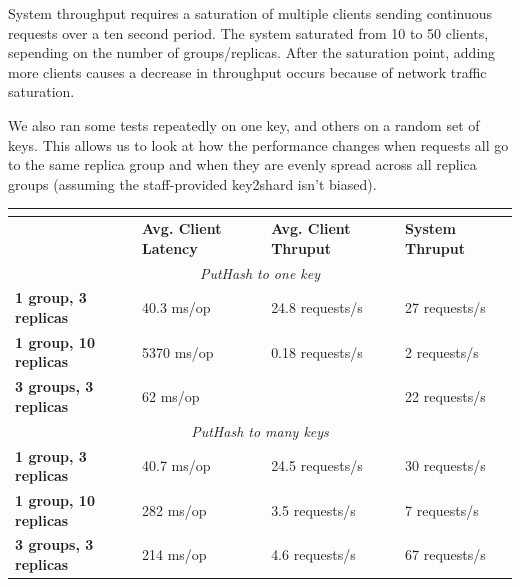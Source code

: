 \documentclass[letterpaper,10pt]{article}
\begin{document}
System throughput requires a saturation of multiple clients sending
continuous requests over a ten second period. The system saturated
from 10 to 50 clients, sepending on the number of
groups/replicas. After the saturation point, adding more clients
causes a decrease in throughput occurs because of network traffic
saturation.

We also ran some tests repeatedly on one key, and others on a random
set of keys. This allows us to look at how the performance changes
when requests all go to the same replica group and when they are
evenly spread across all replica groups (assuming the staff-provided
key2shard isn't biased).

\begin{table}[h]
\begin{tabular}{|l|l|l|l|}
\hline
\multicolumn{4}{|c|}{\cellcolor[HTML]{C0C0C0}{\color[HTML]{000000} \textbf{Vanilla Paxos}}}                           \\ \hline
                              & \textbf{Avg. Client Latency} & \textbf{Avg. Client Thruput} & \textbf{System Thruput} \\ \hline
\multicolumn{4}{|c|}{\textit{PutHash to one key}}                                                                     \\ \hline
\textbf{1 group, 3 replicas}  & 40.3 ms/op                   & 24.8 requests/s              & 27 requests/s           \\ \hline
\textbf{1 group, 10 replicas} & 5370 ms/op                   & 0.18 requests/s              & 2 requests/s            \\ \hline
\textbf{3 groups, 3 replicas} & 62 ms/op                     &                              & 22 requests/s           \\ \hline
\multicolumn{4}{|c|}{\textit{PutHash to many keys}}                                                                   \\ \hline
\textbf{1 group, 3 replicas}  & 40.7 ms/op                   & 24.5 requests/s              & 30 requests/s           \\ \hline
\textbf{1 group, 10 replicas} & 282 ms/op                    & 3.5 requests/s               & 7 requests/s            \\ \hline
\textbf{3 groups, 3 replicas} & 214 ms/op                    & 4.6 requests/s               & 67 requests/s           \\ \hline
\end{tabular}
\end{table}
\end{document}
